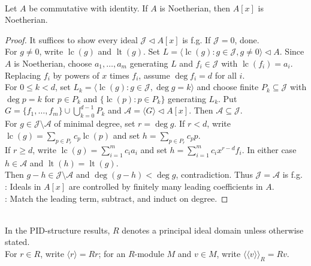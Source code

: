 \begin{theorem} \label{thm:hilbert-basis-theorem} \\
Let $A$ be commutative with identity. If $A$ is Noetherian, then $A[x]$ is Noetherian.
\begin{proof}
It suffices to show every ideal $\mathcal{J}\lhd A[x]$ is f.g. If $\mathcal{J}=0$, done.\\
For $g\neq0$, write $\operatorname{lc}(g)$ and $\operatorname{lt}(g)$. Set $L=\langle\operatorname{lc}(g):g\in\mathcal{J}, g\neq0\rangle\lhd A$. Since $A$ is Noetherian, choose $a_1,\ldots,a_m$ generating $L$ and $f_i\in\mathcal{J}$ with $\operatorname{lc}(f_i)=a_i$. Replacing $f_i$ by powers of $x$ times $f_i$, assume $\deg f_i=d$ for all $i$.\\
For $0\leq k<d$, set $L_k=\langle\operatorname{lc}(g):g\in\mathcal{J}, \deg g=k\rangle$ and choose finite $P_k\subseteq\mathcal{J}$ with $\deg p=k$ for $p\in P_k$ and $\{\operatorname{lc}(p):p\in P_k\}$ generating $L_k$. Put $G=\{f_1,\ldots,f_m\}\cup\bigcup_{k=0}^{d-1}P_k$ and $\mathcal{A}=\langle G\rangle\lhd A[x]$. Then $\mathcal{A}\subseteq\mathcal{J}$.\\
For $g\in\mathcal{J}\setminus\mathcal{A}$ of minimal degree, set $r=\deg g$. If $r<d$, write $\operatorname{lc}(g)=\sum_{p\in P_r}c_p\operatorname{lc}(p)$ and set $h=\sum_{p\in P_r}c_pp$.\\
If $r\geq d$, write $\operatorname{lc}(g)=\sum_{i=1}^{m}c_ia_i$ and set $h=\sum_{i=1}^{m}c_ix^{r-d}f_i$. In either case $h\in\mathcal{A}$ and $\operatorname{lt}(h)=\operatorname{lt}(g)$.\\
Then $g-h\in\mathcal{J}\setminus\mathcal{A}$ and $\deg(g-h)<\deg g$, contradiction. Thus $\mathcal{J}=\mathcal{A}$ is f.g.\\
: Ideals in $A[x]$ are controlled by finitely many leading coefficients in $A$.\\
: Match the leading term, subtract, and induct on degree.
\end{proof}
\end{theorem}

\begin{definition} \label{def:standing-pid-notation} \\
In the PID-structure results, $R$ denotes a principal ideal domain unless otherwise stated.\\
For $r\in R$, write $\langle r\rangle=Rr$; for an $R$-module $M$ and $v\in M$, write $\langle\!\langle v\rangle\!\rangle_R=Rv$.
\end{definition}

